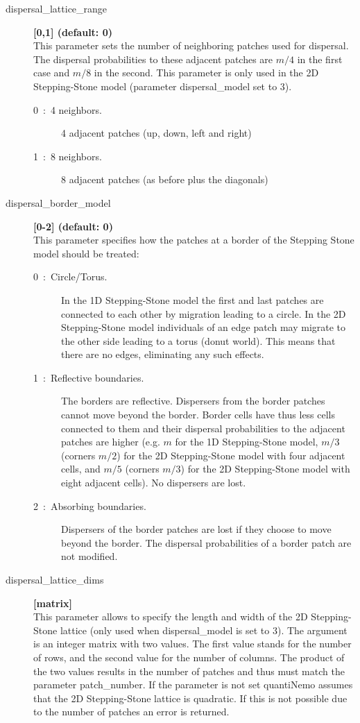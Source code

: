 \documentclass[letterpaper,12pt,oneside]{book}
\begin{document}
\begin{description}
\item[dispersal\_lattice\_range] \textbf{[0,1] (default: 0)}\\
This parameter sets the number of neighboring patches used for dispersal. The dispersal probabilities to these adjacent patches are $m/4$ in the first case and $m/8$ in the second. This parameter is only used in the 2D Stepping-Stone model (parameter \textsf{dispersal\_model} set to 3).
\begin{description}
\item[0~:~4 neighbors.]4 adjacent patches (up, down, left and right)
\item[1~:~8 neighbors.]8 adjacent patches (as before plus the diagonals)
\end{description}

\item[dispersal\_border\_model] \textbf{[0-2] (default: 0)}\\
This parameter specifies how the patches at a border of the Stepping Stone model should be treated:
\begin{description}
\item[0~:~Circle/Torus.] In the 1D Stepping-Stone model the first and last patches are connected to each other by migration leading to a circle. In the 2D Stepping-Stone model individuals of an edge patch may migrate to the other side leading to a torus (donut world). This means that there are no edges, eliminating any such effects.
\item[1~:~Reflective boundaries.] The borders are reflective. Dispersers from the border patches cannot move beyond the border. Border cells have thus less cells connected to them and their dispersal probabilities to the adjacent patches are higher (e.g. $m$ for the 1D Stepping-Stone model, $m/3$ (corners $m/2$) for the 2D Stepping-Stone model with four adjacent cells, and $m/5$ (corners $m/3$) for the 2D Stepping-Stone model with eight adjacent cells). No dispersers are lost.
\item[2~:~Absorbing boundaries.] Dispersers of the border patches are lost if they choose to move beyond the border. The dispersal probabilities of a border patch are not modified. 
\end{description}

\item[dispersal\_lattice\_dims] \textbf{[matrix]}\\
This parameter allows to specify the length and width of the 2D Stepping-Stone lattice (only used when \textsf{dispersal\_model} is set to 3). The argument is an integer matrix with two values. The first value stands for the number of rows, and the second value for the number of columns. The product of the two values results in the number of patches and thus must match the parameter \textsf{patch\_number}. If the parameter is not set quantiNemo assumes that the 2D Stepping-Stone lattice is quadratic. If this is not possible due to the number of patches an error is returned. 



\end{description}
\end{document}
